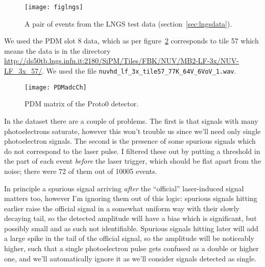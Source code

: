 
\begin{figure}
    \hspace{-0.26\textwidth}\texttt{[image: figlngs]}
    
    \caption{A pair of events from the LNGS test data
    (section~\ref{sec:lngsdata}).}
    
    \label{fig:lngs}
\end{figure}

We used the PDM slot 8 data, which as per figure~\ref{fig:pdmadcch} corresponds
to tile 57 which means the data is in the directory
\url{http://ds50tb.lngs.infn.it:2180/SiPM/Tiles/FBK/NUV/MB2-LF-3x/NUV-LF_3x_57/}. We used the file \nolinkurl{nuvhd_lf_3x_tile57_77K_64V_6VoV_1.wav}.


\begin{figure}
    \texttt{[image: PDMadcCh]}
    
    \caption{PDM matrix of the Proto0 detector.}
    
    \label{fig:pdmadcch}
\end{figure}

In the dataset there are a couple of problems. The first is that signals with
many photoelectrons saturate, however this won't trouble us since we'll need
only single photoelectron signals. The second is the presence of some spurious
signals which do not correspond to the laser pulse. I filtered these out by
putting a threshold in the part of each event \emph{before} the laser trigger,
which should be flat apart from the noise; there were 72 of them out of
\num{10005} events.

In principle a spurious signal arriving \emph{after} the ``official''
laser-induced signal matters too, however I'm ignoring them out of this logic:
spurious signals hitting earlier raise the official signal in a somewhat
uniform way with their slowly decaying tail, so the detected amplitude will
have a bias which is significant, but possibly small and as such not
identifiable. Spurious signals hitting later will add a large spike in the tail
of the official signal, so the amplitude will be noticeably higher, such that a
single photoelectron pulse gets confused as a double or higher one, and
we'll automatically ignore it as we'll consider signals detected as single.

